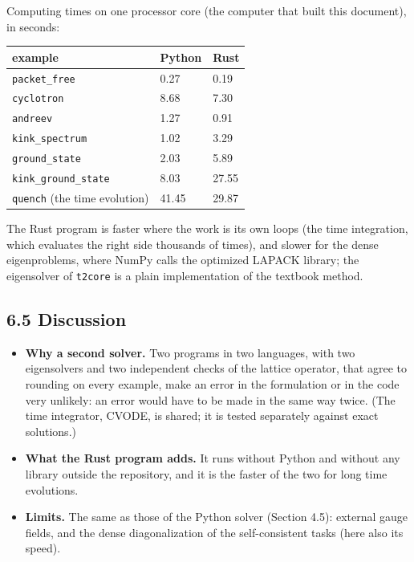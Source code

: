 \documentclass[
  10pt,
]{article}
\providecommand{\tightlist}{%
  \setlength{\itemsep}{0pt}\setlength{\parskip}{0pt}}
\begin{document}
Computing times on one processor core (the computer that built this
document), in seconds:

\begin{longtable}[]{@{}lll@{}}
\toprule\noalign{}
example & Python & Rust \\
\midrule\noalign{}
\endhead
\bottomrule\noalign{}
\endlastfoot
\texttt{packet\_free} & 0.27 & 0.19 \\
\texttt{cyclotron} & 8.68 & 7.30 \\
\texttt{andreev} & 1.27 & 0.91 \\
\texttt{kink\_spectrum} & 1.02 & 3.29 \\
\texttt{ground\_state} & 2.03 & 5.89 \\
\texttt{kink\_ground\_state} & 8.03 & 27.55 \\
\texttt{quench} (the time evolution) & 41.45 & 29.87 \\
\end{longtable}

The Rust program is faster where the work is its own loops (the time
integration, which evaluates the right side thousands of times), and
slower for the dense eigenproblems, where NumPy calls the optimized
LAPACK library; the eigensolver of \texttt{t2core} is a plain
implementation of the textbook method.

\hypertarget{discussion-4}{%
\subsection{6.5 Discussion}\label{discussion-4}}

\begin{itemize}
\tightlist
\item
  \textbf{Why a second solver.} Two programs in two languages, with two
  eigensolvers and two independent checks of the lattice operator, that
  agree to rounding on every example, make an error in the formulation
  or in the code very unlikely: an error would have to be made in the
  same way twice. (The time integrator, CVODE, is shared; it is tested
  separately against exact solutions.)
\item
  \textbf{What the Rust program adds.} It runs without Python and
  without any library outside the repository, and it is the faster of
  the two for long time evolutions.
\item
  \textbf{Limits.} The same as those of the Python solver (Section 4.5):
  external gauge fields, and the dense diagonalization of the
  self-consistent tasks (here also its speed).
\end{itemize}
\end{document}
